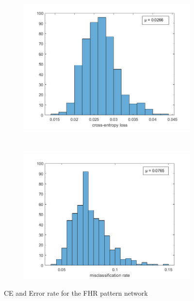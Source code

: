 \documentclass[11pt,a4paper]{article}
\begin{document}
\begin{figure}[htb]
  \centering
  \begin{subfigure}[b]{0.45\textwidth}
    \centering
    \includegraphics[width=\textwidth]{figures/CLASS/ce_hist_500.png}
  \end{subfigure}
  ~
  \begin{subfigure}[b]{0.45\textwidth}
    \centering
    \includegraphics[width=\textwidth]{figures/CLASS/misclassification_hist_500.png}
  \end{subfigure}
  \caption{CE and Error rate for the FHR pattern network}
  \label{fig:CLASS_HIST}
\end{figure}
\end{document}
